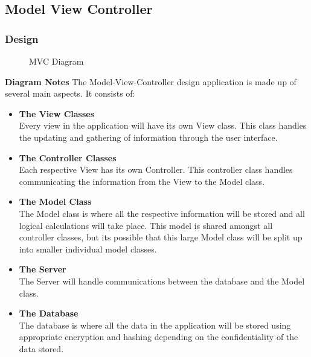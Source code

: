 \documentclass[a4paper]{article}
\begin{document}
\subsection{Model View Controller}
\subsubsection{Design}
\begin{figure}[!ht] %
    \centering{} %
    \caption{MVC Diagram}
    \label{fig:mvc}
\end{figure}

\textbf{Diagram Notes}
The Model-View-Controller design application is made up of several main aspects. It consists of: 
\begin{itemize}
    \item \textbf{The View Classes} \\ 
    Every view in the application will have its own View class. This class handles the updating and gathering of information through the user interface. \\
    \item \textbf{The Controller Classes} \\ 
    Each respective View has its own Controller. This controller class handles communicating the information from the View to the Model class. \\
    \item \textbf{The Model Class} \\ 
    The Model class is where all the respective information will be stored and all logical calculations will take place. This model is shared amongst all controller classes, but its possible that this large Model class will be split up into smaller individual model classes. \\
    \item \textbf{The Server} \\ 
    The Server will handle communications between the database and the Model class. \\
    \item \textbf{The Database} \\ 
    The database is where all the data in the application will be stored using appropriate encryption and hashing depending on the confidentiality of the data stored.
\end{itemize}
\end{document}
